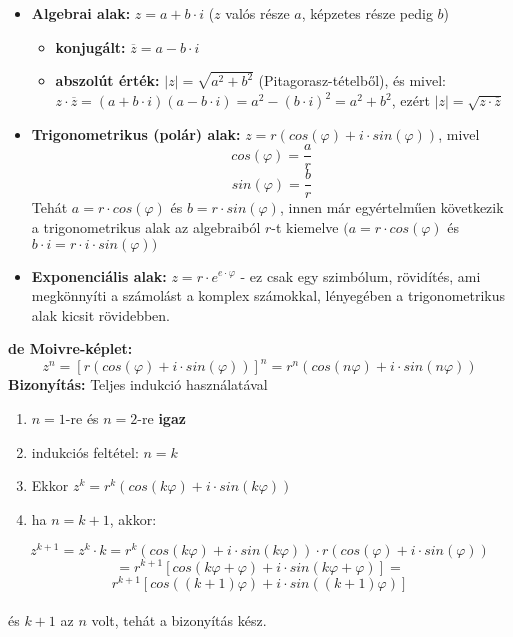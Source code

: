 \documentclass[12pt,a4paper]{article}
\begin{document}
\begin{tcolorbox}[colback=green!5!white,colframe=green!60!black,title= 4. Komplex számok algebrai{,} trigonometrikus{,} exponenciális alakja]
    \begin{itemize}
        \item \textbf{Algebrai alak:} \(z = a + b\cdot i\) (\(z\) valós része \(a\), képzetes része pedig \(b\))
        \begin{itemize}
            \item \textbf{konjugált:} \(\overline{z} = a - b\cdot i\)
            \item \textbf{abszolút érték:} \(\left\lvert z \right\rvert  = \sqrt{a^2+b^2}\) (Pitagorasz-tételből), és mivel: \\ \(z \cdot \overline{z} = (a + b\cdot i)(a - b\cdot i) = a^2 -(b\cdot i)^2=a^2+b^2\), ezért \( \left\lvert z\right\rvert =\sqrt{z \cdot \overline{z} }  \)
        \end{itemize}
        \item \textbf{Trigonometrikus (polár) alak:} \(z = r(cos(\varphi ) + i \cdot sin(\varphi))\), mivel
        $$ cos(\varphi)=\frac{a}{r} $$
        $$ sin(\varphi)=\frac{b}{r} $$
        Tehát \(a = r\cdot cos(\varphi)\) és \(b = r\cdot sin(\varphi)\), innen már egyértelműen következik a trigonometrikus alak az algebraiból \(r\)-t kiemelve \((a = r\cdot cos(\varphi)\) és \(b\cdot i = r \cdot i\cdot sin(\varphi))\)
        \item \textbf{Exponenciális alak:} \(z = r \cdot e^{e\cdot \varphi}\) - ez csak egy szimbólum, rövidítés, ami megkönnyíti a
        számolást a komplex számokkal, lényegében a trigonometrikus alak kicsit rövidebben.
    \end{itemize}
\end{tcolorbox}

\begin{tcolorbox}[colback=green!5!white,colframe=green!60!black,title= 5. Komplex számok hatványozása]
    \textbf{de Moivre-képlet:} 
    $$z^n = [r(cos(\varphi)+i\cdot sin(\varphi))]^n=r^n(cos(n\varphi)+i\cdot sin(n\varphi))$$
    \textbf{Bizonyítás:} Teljes indukció használatával
    \begin{enumerate}
        \item \(n=1\)-re és \(n=2\)-re \textbf{igaz}
        \item indukciós feltétel: \(n = k\)
        \item Ekkor \(z^k= r^k(cos(k\varphi)+i\cdot sin(k\varphi))\)
        \item ha \(n = k + 1\), akkor:
    \end{enumerate}
    $$z^{k+1}=z^k\cdot k = r^k(cos(k\varphi)+i\cdot sin(k\varphi))\cdot r(cos(\varphi) +i\cdot sin(\varphi))$$
    $$=r^{k+1}[cos(k\varphi + \varphi)+ i\cdot sin(k\varphi + \varphi)] =$$
    $$r^{k+1}[cos((k+1)\varphi)+ i\cdot sin((k+1)\varphi)] $$\\
    és \(k+1\) az \(n\) volt, tehát a bizonyítás kész.

\end{tcolorbox}
\end{document}
